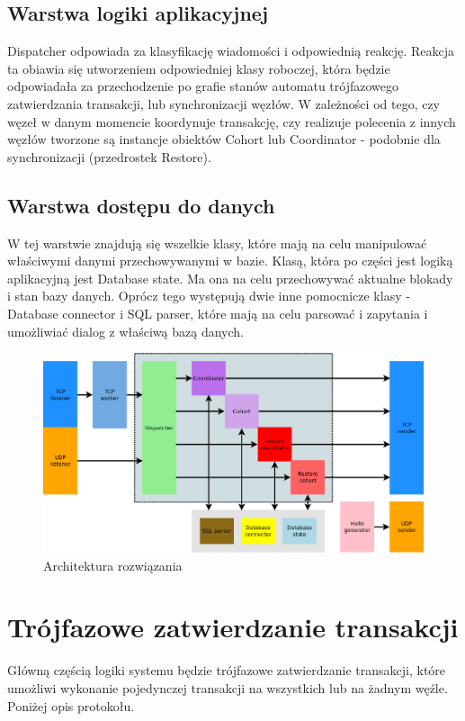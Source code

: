 \documentclass[a4paper, oneside, 11pt]{report}
\begin{document}
\section{Warstwa logiki aplikacyjnej}
Dispatcher odpowiada za klasyfikację wiadomości i odpowiednią reakcję. Reakcja ta obiawia się utworzeniem odpowiedniej klasy roboczej, która będzie odpowiadała za przechodzenie po grafie stanów automatu trójfazowego zatwierdzania transakcji, lub synchronizacji węzłów. W zależności od tego, czy węzeł w danym momencie koordynuje transakcję, czy realizuje polecenia z innych węzłów tworzone są instancje obiektów Cohort lub Coordinator - podobnie dla synchronizacji (przedrostek Restore).

\section{Warstwa dostępu do danych}
W tej warstwie znajdują się wszelkie klasy, które mają na celu manipulować właściwymi danymi przechowywanymi w bazie. Klasą, która po części jest logiką aplikacyjną jest Database state. Ma ona na celu przechowywać aktualne blokady i stan bazy danych. Oprócz tego występują dwie inne pomocnicze klasy - Database connector i SQL parser, które mają na celu parsować i zapytania i umożliwiać dialog z właściwą bazą danych.
\begin{figure}[h]
\centering
\includegraphics[width=22cm,angle=90]{architektura.png}
\caption{Architektura rozwiązania}
\end{figure}
\pagebreak

\chapter{Trójfazowe zatwierdzanie transakcji}
Główną częścią logiki systemu będzie trójfazowe zatwierdzanie transakcji, które umożliwi wykonanie pojedynczej transakcji na wszystkich lub na żadnym węźle. Poniżej opis protokołu.
\end{document}
